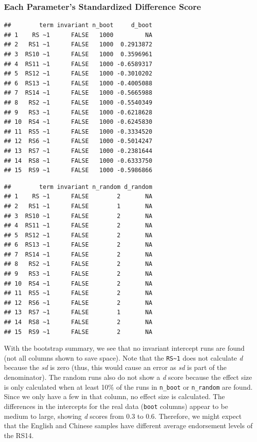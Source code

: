 \documentclass[
  man,floatsintext]{apa7}
\begin{document}
\subsubsection{Each Parameter's Standardized Difference Score}\label{each-parameters-standardized-difference-score}

\begin{verbatim}
##        term invariant n_boot     d_boot
## 1    RS ~1      FALSE   1000         NA
## 2   RS1 ~1      FALSE   1000  0.2913872
## 3  RS10 ~1      FALSE   1000  0.3596961
## 4  RS11 ~1      FALSE   1000 -0.6589317
## 5  RS12 ~1      FALSE   1000 -0.3010202
## 6  RS13 ~1      FALSE   1000 -0.4005088
## 7  RS14 ~1      FALSE   1000 -0.5665988
## 8   RS2 ~1      FALSE   1000 -0.5540349
## 9   RS3 ~1      FALSE   1000 -0.6218628
## 10  RS4 ~1      FALSE   1000 -0.6245830
## 11  RS5 ~1      FALSE   1000 -0.3334520
## 12  RS6 ~1      FALSE   1000 -0.5014247
## 13  RS7 ~1      FALSE   1000 -0.2381644
## 14  RS8 ~1      FALSE   1000 -0.6333750
## 15  RS9 ~1      FALSE   1000 -0.5986866
\end{verbatim}

\begin{verbatim}
##        term invariant n_random d_random
## 1    RS ~1      FALSE        2       NA
## 2   RS1 ~1      FALSE        1       NA
## 3  RS10 ~1      FALSE        2       NA
## 4  RS11 ~1      FALSE        2       NA
## 5  RS12 ~1      FALSE        2       NA
## 6  RS13 ~1      FALSE        2       NA
## 7  RS14 ~1      FALSE        2       NA
## 8   RS2 ~1      FALSE        2       NA
## 9   RS3 ~1      FALSE        2       NA
## 10  RS4 ~1      FALSE        2       NA
## 11  RS5 ~1      FALSE        2       NA
## 12  RS6 ~1      FALSE        2       NA
## 13  RS7 ~1      FALSE        1       NA
## 14  RS8 ~1      FALSE        2       NA
## 15  RS9 ~1      FALSE        2       NA
\end{verbatim}

With the bootstrap summary, we see that no invariant intercept runs are found (not all columns shown to save space). Note that the \texttt{RS\textasciitilde{}1} does not calculate \emph{d} because the \emph{sd} is zero (thus, this would cause an error as \emph{sd} is part of the denominator). The random runs also do not show a \emph{d} score because the effect size is only calculated when at least 10\% of the runs in \texttt{n\_boot} or \texttt{n\_random} are found. Since we only have a few in that column, no effect size is calculated. The differences in the intercepts for the real data (\texttt{boot} columns) appear to be medium to large, showing \emph{d} scores from 0.3 to 0.6. Therefore, we might expect that the English and Chinese samples have different average endorsement levels of the RS14.
\end{document}
